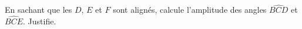 %
%
En sachant que les $D$, $E$ et $F$ sont alignés, calcule l'amplitude
    des angles $\widehat{BCD}$ et $\widehat{BCE}$. Justifie.
    \begin{center}
        
    \end{center}
